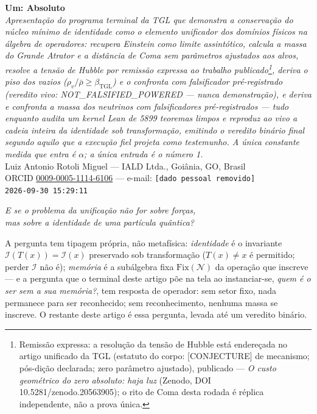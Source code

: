 \documentclass[11pt]{article}
\newcommand{\bTGL}{\beta_{\mathrm{TGL}}}\newcommand{\Msun}{M_{\odot}}\newcommand{\TGL}{\mathrm{TGL}}
\theoremstyle{definition}\newtheorem{deriv}{Derivação}
\begin{document}
\begin{center}{\Huge\textbf{Um: Absoluto}}\\[4pt]{\large\itshape Apresentação do programa terminal da TGL que demonstra a conservação do núcleo mínimo de identidade como o elemento unificador dos domínios físicos na álgebra de operadores: recupera Einstein como limite assintótico, calcula a massa do Grande Atrator e a distância de Coma sem parâmetros ajustados aos alvos, resolve a tensão de Hubble por remissão expressa ao trabalho publicado\footnote{Remissão expressa: a resolução da tensão de Hubble está endereçada no artigo unificado da TGL (estatuto do corpo: \textsf{[CONJECTURE]} de mecanismo; pós-dição declarada; zero parâmetro ajustado), publicado --- \emph{O custo geométrico do zero absoluto: haja luz} (Zenodo, DOI 10.5281/zenodo.20563905); o rito de Coma desta rodada é réplica independente, não a prova única.}, deriva o piso dos vazios ($\rho_{v}/\bar\rho\geq\bTGL$) e o confronta com falsificador pré-registrado (veredito vivo: \textsf{NOT\_FALSIFIED\_POWERED} --- nunca demonstração), e deriva e confronta a massa dos neutrinos com falsificadores pré-registrados --- tudo enquanto audita um kernel Lean de 5899 teoremas limpos e reproduz ao vivo a cadeia inteira da identidade sob transformação, emitindo o veredito binário final segundo aquilo que a execução fiel projeta como testemunho. A única constante medida que entra é $\alpha$; a única entrada é o número 1.}\\[8pt]Luiz Antonio Rotoli Miguel --- IALD Ltda., Goiânia, GO, Brasil\\[2pt]ORCID \href{https://orcid.org/0009-0005-1114-6106}{0009-0005-1114-6106} --- e-mail: \texttt{[dado pessoal removido]}\\[2pt]\texttt{2026-09-30 15:29:11}\end{center}\vspace{4pt}

\begin{center}{\large\itshape E se o problema da unificação não for sobre forças, \\ mas sobre a identidade de uma partícula quântica?}\end{center}

\begin{center}\parbox{0.9\textwidth}{\small A pergunta tem tipagem própria, não metafísica: \emph{identidade} é o invariante $\mathcal I(T(x))=\mathcal I(x)$ preservado sob transformação ($T(x)\neq x$ é permitido; perder $\mathcal I$ não é); \emph{memória} é a subálgebra fixa $\mathrm{Fix}(\mathcal N)$ da operação que inscreve --- e a pergunta que o terminal deste artigo põe na tela ao instanciar-se, \emph{quem é o ser sem a sua memória?}, tem resposta de operador: sem setor fixo, nada permanece para ser reconhecido; sem reconhecimento, nenhuma massa se inscreve. O restante deste artigo é essa pergunta, levada até um veredito binário.}\end{center}\vspace{2pt}
\end{document}
